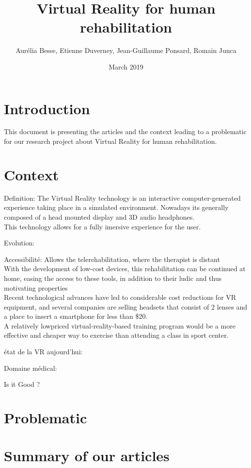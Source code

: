 \documentclass{article}
\title{Virtual Reality for human rehabilitation}
\author{ Aurélia Besse, Etienne Duverney, Jean-Guillaume Ponsard, Romain Junca }
\date{March 2019}
\begin{document}
\maketitle

\section{Introduction}

This document is presenting the articles and the context leading to a problematic for our research project about Virtual Reality for human rehabilitation.


\section{Context}

Definition:
The Virtual Reality technology is an interactive computer-generated experience taking place in a simulated environment. Nowadays its generally composed of a head mounted display and 3D audio headphones. \\
This technology allows for a fully imersive experience for the user.

Evolution:


Accessibilité:
Allows the telerehabilitation, where the therapist is distant 
\\ With the development of low-cost devices, this rehabilitation can be continued at home, easing the access to these tools, in addition to their ludic and thus motivating properties
\\ Recent technological advances have led to considerable cost reductions for VR equipment, and several companies are selling headsets that consist of 2 lenses and a place to insert a smartphone for less than \$20.
\\ A relatively lowpriced virtual-reality-based training program would be a more effective and cheaper way to exercise than attending a class in sport center.

état de la VR aujourd'hui:


Domaine médical:


Is it Good ?


\section{Problematic}


\section{Summary of our articles}
\end{document}

